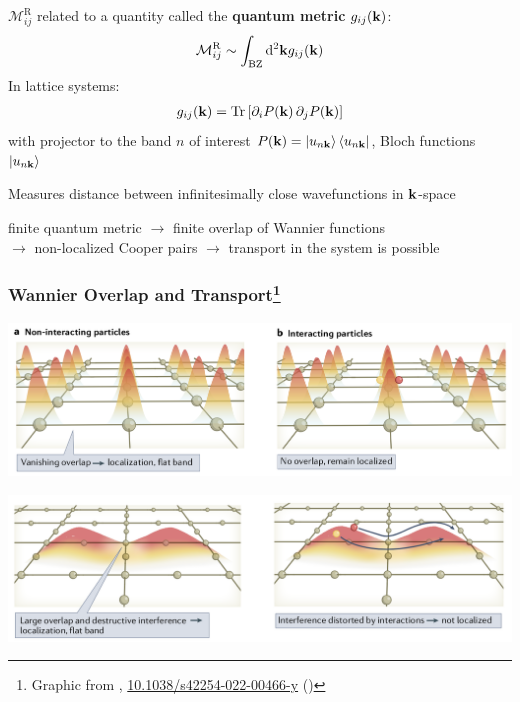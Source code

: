 \documentclass[aspectratio=169]{beamer}
\DeclareMathOperator{\Tr}{Tr}
\begin{document}
\begin{frame}
	\(\mathcal{M}_{ij}^{\textrm{R}}\) related to a quantity called the \textbf{quantum metric} \(g_{ij} (\mathbf{k})\):
	\begin{equation}
		\mathcal{M}_{ij}^{\textrm{R}} \sim \int_{\textrm{BZ}} \odif[order=2]{\vb{k}} g_{ij} (\vb{k})
	\end{equation}\pause
	In lattice systems:
	\begin{align}
		g_{ij} (\vb{k}) = \Tr{\left[\pdif{i} P(\vb{k}) \pdif{j} P(\vb{k}) \right]} 
	\end{align}
	with projector to the band \(n\) of interest \(P(\mathbf{k}) = \ket{u_{n \mathbf{k}}} \bra{u_{n \mathbf{k}}}\), Bloch functions \(\ket{u_{n \mathbf{k}}}\)

	Measures distance between infinitesimally close wavefunctions in \(\mathbf{k}\)-space\pause
	
	\begin{block}{}
		 \begin{center}
		 	finite quantum metric \pause\(\to\) finite overlap of Wannier functions \\ \pause \(\to\) non-localized Cooper pairs \pause\(\to\) transport in the system is possible
		 \end{center}
	\end{block}
\end{frame}

\begin{frame}
	\frametitle{Wannier Overlap and Transport\footnote[frame]{Graphic from \citeauthor{tormaSuperconductivitySuperfluidityQuantum2022}, \href{https://doi.org/10.1038/s42254-022-00466-y}{10.1038/s42254-022-00466-y} (\citeyear{tormaSuperconductivitySuperfluidityQuantum2022})}}
	
	\begin{center}
		\includegraphics[width=0.7\linewidth]{"figs/Wannier function overlap 1"}
	\end{center}	\pause
	\begin{center}
		\includegraphics[width=0.7\linewidth]{"figs/Wannier function overlap 2"}
	\end{center}
\end{frame}
\end{document}
